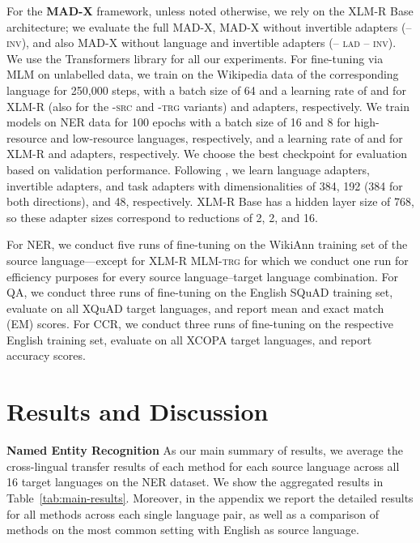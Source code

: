 \documentclass[11pt,a4paper]{article}
\newcommand{\model}[1]{\textsc{MAD-X}}
\newcommand{\mlmtrg}[1]{\textsc{XLM-R MLM-trg}}
\begin{document}
For the \textbf{\model{}} framework, unless noted otherwise, we rely on the XLM-R Base architecture; we evaluate the full \model{}, \model{} without invertible adapters (--\textsc{inv}), and also \model{} without language and invertible adapters (-- \textsc{lad} -- \textsc{inv}). We use the Transformers library \cite{Wolf2019transformers} for all our experiments. For fine-tuning via MLM on unlabelled data, we train on the Wikipedia data of the corresponding language for 250,000 steps, with a batch size of 64 and a learning rate of  and  for XLM-R (also for the \textsc{-src} and \textsc{-trg} variants) and adapters,  respectively. We train models on NER data for 100 epochs with a batch size of 16 and 8 for high-resource and low-resource languages, respectively, and a learning rate of  and  for XLM-R and adapters, respectively. We choose the best checkpoint for evaluation based on validation performance. Following \citet{Pfeiffer2020adapterfusion}, we learn language adapters, invertible adapters, and task adapters with dimensionalities of 384, 192 (384 for both directions), and 48, respectively. XLM-R Base has a hidden layer size of 768, so these adapter sizes correspond to reductions of 2, 2, and 16.

For NER, we conduct five runs of fine-tuning on the WikiAnn training set of the source language---except for \mlmtrg{} for which we conduct one run for efficiency purposes for every source language--target language combination. For QA, we conduct three runs of fine-tuning on the English SQuAD training set, evaluate on all XQuAD target languages, and report mean  and exact match (EM) scores. For CCR, we conduct three runs of fine-tuning on the respective English training set, evaluate on all XCOPA target languages, and report accuracy scores.

 

\section{Results and Discussion} 
\label{sec:results}

 
\noindent \textbf{Named Entity Recognition}\hspace{0.3mm}
As our main summary of results, we average the cross-lingual transfer results of each method for each source language across all 16 target languages on the NER dataset. We show the aggregated results in Table~\ref{tab:main-results}. Moreover, in the appendix we report the detailed results for all methods across each single language pair, as well as a comparison of methods on the most common setting with English as source language.
\end{document}
